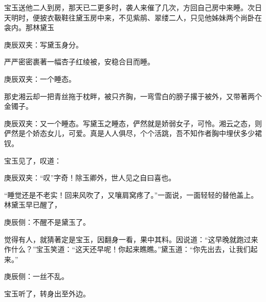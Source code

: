 \begin{parag}
    宝玉送他二人到房，那天已二更多时，袭人来催了几次，方回自己房中来睡。次日天明时，便披衣靸鞋往黛玉房中来，不见紫鹃、翠缕二人，只见他姊妹两个尚卧在衾内。那林黛玉\begin{note}庚辰双夹：写黛玉身分。\end{note}严严密密裹著一幅杏子红绫被，安稳合目而睡。\begin{note}庚辰双夹：一个睡态。\end{note}那史湘云却一把青丝拖于枕畔，被只齐胸，一弯雪白的膀子撂于被外，又带著两个金镯子。\begin{note}庚辰双夹：又一个睡态。写黛玉之睡态，俨然就是娇弱女子，可怜。湘云之态，则俨然是个娇态女儿，可爱。真是人人俱尽，个个活跳，吾不知作者胸中埋伏多少裙钗。\end{note}宝玉见了，叹道：\begin{note}庚辰双夹：“叹”字奇！除玉卿外，世人见之自曰喜也。\end{note}“睡觉还是不老实！回来风吹了，又嚷肩窝疼了。”一面说，一面轻轻的替他盖上。林黛玉早已醒了，\begin{note}庚辰侧：不醒不是黛玉了。\end{note}觉得有人，就猜著定是宝玉，因翻身一看，果中其料。因说道：“这早晚就跑过来作什么？”宝玉笑道：“这天还早呢！你起来瞧瞧。”黛玉道：“你先出去，让我们起来。”\begin{note}庚辰侧：一丝不乱。\end{note}宝玉听了，转身出至外边。
\end{parag}


